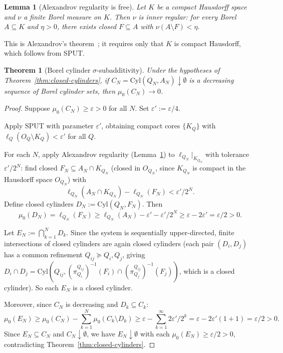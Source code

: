 \documentclass[11pt]{article}
\newtheorem{theorem}{Theorem}
\newtheorem{lemma}{Lemma}
\theoremstyle{definition}
\begin{document}
\begin{lemma}[Alexandrov regularity is free]
\label{lem:alexandrov}
Let $K$ be a compact Hausdorff space and $\nu$ a finite Borel measure
on $K$.  Then $\nu$ is inner regular: for every Borel $A \subseteq K$
and $\eta > 0$, there exists closed $F \subseteq A$ with
$\nu(A \setminus F) < \eta$.
\end{lemma}

This is Alexandrov's theorem~\cite{Alexandrov1943,Bogachev2007}; it requires only that $K$ is compact
Hausdorff, which follows from SPUT.

\begin{theorem}[Borel cylinder $\sigma$-subadditivity]
\label{thm:borel-cylinders}
Under the hypotheses of Theorem~\ref{thm:closed-cylinders}, if
$C_N = \mathrm{Cyl}(Q_N, A_N) \downarrow \emptyset$ is a decreasing
sequence of Borel cylinder sets, then $\mu_0(C_N) \to 0$.
\end{theorem}

\begin{proof}
Suppose $\mu_0(C_N) \geq \varepsilon > 0$ for all $N$.
Set $\varepsilon' := \varepsilon/4$.

Apply SPUT with parameter $\varepsilon'$, obtaining compact cores
$\{K_Q\}$ with $\ell_Q(O_Q \setminus K_Q) < \varepsilon'$ for all
$Q$.

For each $N$, apply Alexandrov regularity (Lemma~\ref{lem:alexandrov})
to $\ell_{Q_N}|_{K_{Q_N}}$ with tolerance $\varepsilon'/2^N$: find
closed $F_N \subseteq A_N \cap K_{Q_N}$ (closed in $O_{Q_N}$, since
$K_{Q_N}$ is compact in the Hausdorff space $O_{Q_N}$) with
\[
\ell_{Q_N}(A_N \cap K_{Q_N}) - \ell_{Q_N}(F_N) < \varepsilon'/2^N.
\]
Define closed cylinders $D_N := \mathrm{Cyl}(Q_N, F_N)$.  Then
\[
\mu_0(D_N)
= \ell_{Q_N}(F_N)
\geq \ell_{Q_N}(A_N) - \varepsilon' - \varepsilon'/2^N
\geq \varepsilon - 2\varepsilon'
= \varepsilon/2 > 0.
\]

Let $E_N := \bigcap_{k=1}^N D_k$.  Since the system is sequentially
upper-directed, finite intersections of closed cylinders are again
closed cylinders (each pair $(D_i, D_j)$ has a common refinement
$Q_{ij} \succeq Q_i, Q_j$, giving
$D_i \cap D_j = \mathrm{Cyl}(Q_{ij},
(\pi^{Q_{ij}}_{Q_i})^{-1}(F_i) \cap (\pi^{Q_{ij}}_{Q_j})^{-1}(F_j))$,
which is a closed cylinder).  So each $E_N$ is a closed cylinder.

Moreover, since $C_N$ is decreasing and $D_k \subseteq C_k$:
\[
\mu_0(E_N)
\geq \mu_0(C_N) - \sum_{k=1}^N \mu_0(C_k \setminus D_k)
\geq \varepsilon - \sum_{k=1}^\infty 2\varepsilon'/2^k
= \varepsilon - 2\varepsilon'(1 + 1)
= \varepsilon/2 > 0.
\]
Since $E_N \subseteq C_N$ and $C_N \downarrow \emptyset$, we have
$E_N \downarrow \emptyset$ with each $\mu_0(E_N) \geq \varepsilon/2
> 0$, contradicting Theorem~\ref{thm:closed-cylinders}.
\end{proof}
\end{document}
